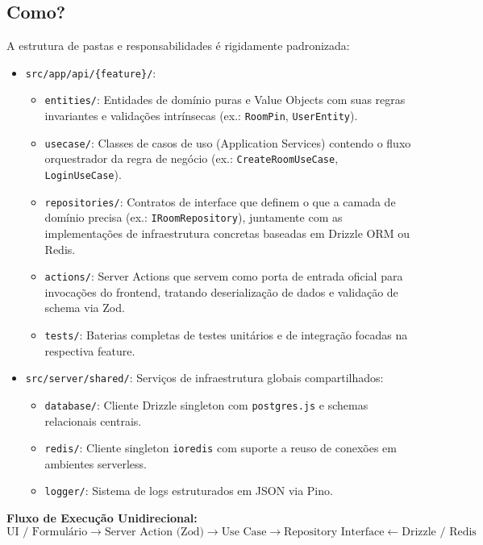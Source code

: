 \documentclass[12pt,a4paper]{article}
\begin{document}
\subsection{Como?}
A estrutura de pastas e responsabilidades é rigidamente padronizada:
\begin{itemize}
  \item \texttt{src/app/api/\{feature\}/}:
  \begin{itemize}
    \item \texttt{entities/}: Entidades de domínio puras e Value Objects com suas regras invariantes e validações intrínsecas (ex.: \texttt{RoomPin}, \texttt{UserEntity}).
    \item \texttt{usecase/}: Classes de casos de uso (Application Services) contendo o fluxo orquestrador da regra de negócio (ex.: \texttt{CreateRoomUseCase}, \texttt{LoginUseCase}).
    \item \texttt{repositories/}: Contratos de interface que definem o que a camada de domínio precisa (ex.: \texttt{IRoomRepository}), juntamente com as implementações de infraestrutura concretas baseadas em Drizzle ORM ou Redis.
    \item \texttt{actions/}: Server Actions que servem como porta de entrada oficial para invocações do frontend, tratando deserialização de dados e validação de schema via Zod.
    \item \texttt{tests/}: Baterias completas de testes unitários e de integração focadas na respectiva feature.
  \end{itemize}
  \item \texttt{src/server/shared/}: Serviços de infraestrutura globais compartilhados:
  \begin{itemize}
    \item \texttt{database/}: Cliente Drizzle singleton com \texttt{postgres.js} e schemas relacionais centrais.
    \item \texttt{redis/}: Cliente singleton \texttt{ioredis} com suporte a reuso de conexões em ambientes serverless.
    \item \texttt{logger/}: Sistema de logs estruturados em JSON via Pino.
  \end{itemize}
\end{itemize}
\textbf{Fluxo de Execução Unidirecional:}
$$\text{UI / Formulário} \longrightarrow \text{Server Action (Zod)} \longrightarrow \text{Use Case} \longrightarrow \text{Repository Interface} \longleftarrow \text{Drizzle / Redis}$$

\end{document}
